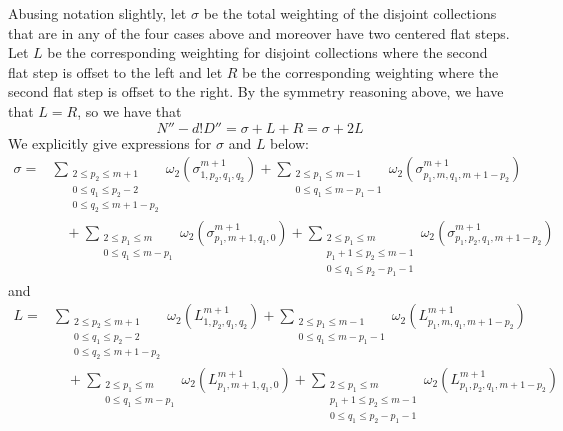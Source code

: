 \documentclass[11pt]{article}
\theoremstyle{mythm}
\begin{document}
Abusing notation slightly, let $\sigma$ be the total weighting of the disjoint collections that are in any of the four cases above and moreover have two centered flat steps. Let $L$ be the corresponding weighting for disjoint collections where the second flat step is offset to the left and let $R$ be the corresponding weighting where the second flat step is offset to the right. By the symmetry reasoning above, we have that $L=R$, so we have that
\begin{equation}\label{eqn:L=R}
N'' - d!D'' = \sigma + L + R = \sigma + 2L
\end{equation}
We explicitly give expressions for $\sigma$ and $L$ below:
\begin{equation}\label{eqn:sigma}
\begin{aligned}
\sigma = &\sum\limits_{\substack{2\leq p_2\leq m+1 \\ 0\leq q_1 \leq p_2-2 \\ 0 \leq q_2 \leq m+1-p_2}}\omega_2(\sigma_{1,p_2,q_1,q_2}^{m+1}) + \sum\limits_{\substack{2 \leq p_1 \leq m-1 \\ 0 \leq q_1 \leq m-p_1-1}}\omega_2(\sigma_{p_1,m,q_1,m+1-p_2}^{m+1}) \\
 &\quad+ \sum\limits_{\substack{2 \leq p_1 \leq m \\ 0 \leq q_1 \leq m-p_1}}\omega_2(\sigma_{p_1,m+1,q_1,0}^{m+1}) + \sum\limits_{\substack{2 \leq p_1 \leq m \\ p_1+1 \leq p_2 \leq m-1 \\ 0 \leq q_1 \leq p_2-p_1-1}} \omega_2(\sigma_{p_1,p_2,q_1,m+1-p_2}^{m+1})
\end{aligned}
\end{equation}
and
\begin{equation}\label{eqn:L}
\begin{aligned}
L = &\sum\limits_{\substack{2\leq p_2\leq m+1 \\ 0\leq q_1 \leq p_2-2 \\ 0 \leq q_2 \leq m+1-p_2}}\omega_2(L_{1,p_2,q_1,q_2}^{m+1}) + \sum\limits_{\substack{2 \leq p_1 \leq m-1 \\ 0 \leq q_1 \leq m-p_1-1}}\omega_2(L_{p_1,m,q_1,m+1-p_2}^{m+1}) \\
 &\quad+ \sum\limits_{\substack{2 \leq p_1 \leq m \\ 0 \leq q_1 \leq m-p_1}}\omega_2(L_{p_1,m+1,q_1,0}^{m+1}) + \sum\limits_{\substack{2 \leq p_1 \leq m \\ p_1+1 \leq p_2 \leq m-1 \\ 0 \leq q_1 \leq p_2-p_1-1}} \omega_2(L_{p_1,p_2,q_1,m+1-p_2}^{m+1})
\end{aligned}
\end{equation}
\end{document}
